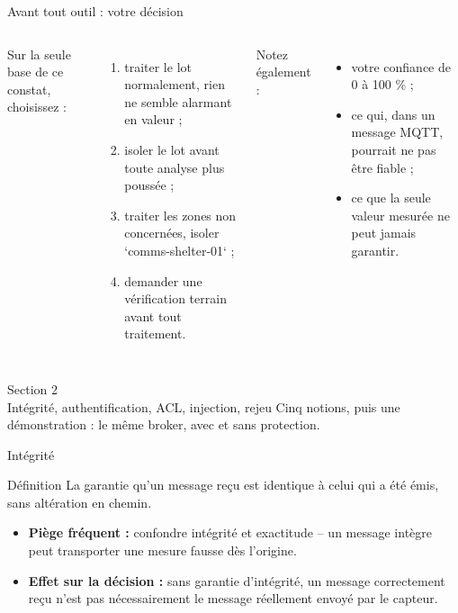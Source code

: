 \documentclass[aspectratio=169]{beamer}
\begin{document}
\begin{frame}{Avant tout outil : votre décision}
  \begin{columns}[T]
    Sur la seule base de ce constat, choisissez :
    \begin{enumerate}
      \item[A.] traiter le lot normalement, rien ne semble alarmant en valeur ;
      \item[B.] isoler le lot avant toute analyse plus poussée ;
      \item[C.] traiter les zones non concernées, isoler `comms-shelter-01` ;
      \item[D.] demander une vérification terrain avant tout traitement.
    \end{enumerate}
    Notez également :
    \begin{itemize}
      \item votre confiance de 0 à 100 \% ;
      \item ce qui, dans un message MQTT, pourrait ne pas être fiable ;
      \item ce que la seule valeur mesurée ne peut jamais garantir.
    \end{itemize}
  \end{columns}
\end{frame}

\begin{frame}[plain]
  \centering
  \Huge Section 2\\[3mm]
  \Large Intégrité, authentification, ACL, injection, rejeu
  \vfill
  \normalsize Cinq notions, puis une démonstration : le même broker, avec et sans protection.
\end{frame}

\begin{frame}{Intégrité}
  \begin{block}{Définition}
    La garantie qu'un message reçu est identique à celui qui a été émis, sans altération en chemin.
  \end{block}
  \begin{itemize}
    \item \textbf{Piège fréquent :} confondre intégrité et exactitude -- un message intègre peut transporter une mesure fausse dès l'origine.
    \item \textbf{Effet sur la décision :} sans garantie d'intégrité, un message correctement reçu n'est pas nécessairement le message réellement envoyé par le capteur.
  \end{itemize}
\end{frame}
\end{document}
